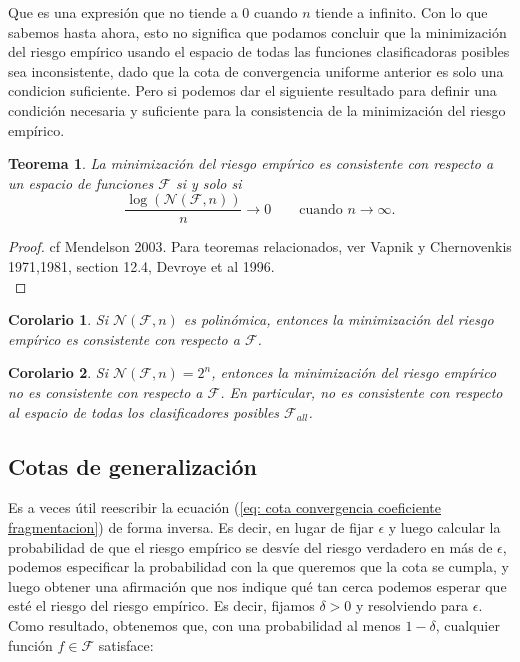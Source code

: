 \documentclass{article}
\newtheorem{thm}{Teorema}[subsection]
\newtheorem{cor}{Corolario}[thm]
\begin{document}
Que es una expresión que no tiende a $0$ cuando $n$ tiende a infinito. Con lo que sabemos hasta ahora, esto no significa que podamos 
concluir que la minimización del riesgo empírico
usando el espacio de todas las funciones clasificadoras posibles sea inconsistente, dado que la cota de convergencia uniforme anterior
es solo una condicion suficiente. Pero si podemos dar el siguiente resultado para definir una condición necesaria y suficiente para
la consistencia de la minimización del riesgo empírico.
\begin{thm}
    La minimización del riesgo empírico es consistente con respecto a un espacio de funciones $\mathcal{F}$ si y solo si
    \[
    \frac{\log\left(\mathcal{N}(\mathcal{F}, n)\right)}{n} \rightarrow 0 \qquad \text{cuando } n \to \infty.
    \]
    
\end{thm}
\begin{proof}
    cf Mendelson 2003. Para teoremas relacionados, ver Vapnik y Chernovenkis 1971,1981, section 12.4, Devroye et al 1996.\\
\end{proof}

\begin{cor}
    Si $\mathcal{N}(\mathcal{F}, n)$ es polinómica, entonces la minimización del riesgo empírico es consistente con respecto a $\mathcal{F}$.\\
\end{cor}
\begin{cor}
    Si $\mathcal{N}(\mathcal{F}, n)=2^n$, entonces la minimización del riesgo empírico no es consistente con respecto a $\mathcal{F}$. En 
    particular, no es consistente con respecto al espacio de todas los clasificadores posibles $\mathcal{F}_{all}$.
\end{cor}

\subsection{Cotas de generalización}

Es a veces útil reescribir la ecuación (\ref{eq: cota convergencia coeficiente fragmentacion}) de forma inversa. Es decir, en lugar de 
fijar \(\epsilon\) y 
luego calcular la probabilidad de que el riesgo empírico se desvíe del riesgo verdadero en más de \(\epsilon\), 
podemos especificar la probabilidad con la que queremos que la cota se cumpla, y luego obtener una afirmación 
que nos indique qué tan cerca podemos esperar que esté el riesgo del riesgo empírico. Es decir, fijamos \(\delta > 0\) 
y resolviendo para \(\epsilon\). Como resultado, obtenemos que, con una probabilidad al menos \(1 - \delta\), cualquier 
función \(f \in \mathcal{F}\) satisface:
\end{document}
